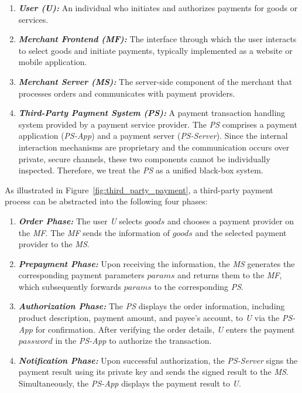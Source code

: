 \documentclass[journal]{IEEEtran}
\newcommand{\rom}[1]{\romannumeral #1}
\begin{document}
\begin{enumerate}[leftmargin=*]
  \item \textit{\textbf{User (U):}}
    An individual who initiates and authorizes payments for goods or services.
  \item \textit{\textbf{Merchant Frontend (MF):}}
    The interface through which the user interacts to select goods and initiate payments,
    typically implemented as a website or mobile application.
  \item \textit{\textbf{Merchant Server (MS):}}
    The server-side component of the merchant that processes orders and communicates with payment providers.
  \item \textit{\textbf{Third-Party Payment System (PS):}}
    A payment transaction handling system provided by a payment service provider.
    The \emph{PS} comprises a payment application (\emph{PS-App}) and a payment server (\emph{PS-Server}).
    Since the internal interaction mechanisms are proprietary and the communication occurs over private, secure channels, these two components cannot be individually inspected.
    Therefore, we treat the \emph{PS} as a unified black-box system.
\end{enumerate}

As illustrated in Figure~\ref{fig:third_party_payment}, a third-party payment process can be abstracted into the following four phases:
\begin{enumerate}[leftmargin=*]
  \item[\rom{1}.] \textit{\textbf{Order Phase:}}
    The user \emph{U} selects $goods$ and chooses a payment provider on the \emph{MF}. 
    The \emph{MF} sends the information of $goods$ and the selected payment provider to the \emph{MS}.
  \item[\rom{2}.] \textit{\textbf{Prepayment Phase:}} 
    Upon receiving the information, the \emph{MS} generates the corresponding payment parameters $params$ and returns them to the \emph{MF},
    which subsequently forwards $params$ to the corresponding \emph{PS}.
  \item[\rom{3}.] \textbf{\textit{Authorization Phase:}} 
    The \emph{PS} displays the order information, including product description, payment amount, and payee's account, to \emph{U} via the \emph{PS-App} for confirmation. 
    After verifying the order details, \emph{U} enters the payment $password$ in the \emph{PS-App} to authorize the transaction.
  \item[\rom{4}.] \textit{\textbf{Notification Phase:}}  
    Upon successful authorization, the \emph{PS-Server} signs the payment result using its private key and sends the signed result to the \emph{MS}.
    Simultaneously, the \emph{PS-App} displays the payment result to \emph{U}.
\end{enumerate}
\end{document}

